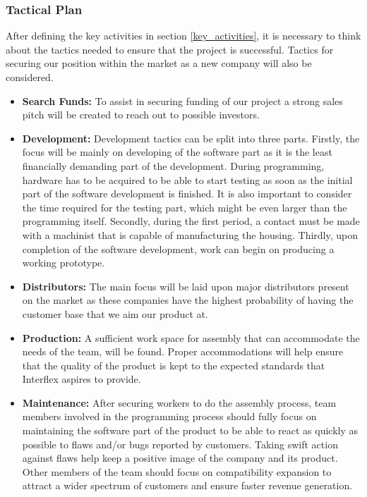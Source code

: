 \subsubsection{Tactical Plan}
After defining the key activities in section \ref{key_activities}, it is necessary to think about the tactics needed to ensure that the project is successful.
Tactics for securing our position within the market as a new company will also be considered.

\begin{itemize}
\item \textbf{Search Funds:} To assist in securing funding of our project a strong sales pitch will be created to reach out to possible investors.
\item \textbf{Development:} Development tactics can be split into three parts. 
Firstly, the focus will be mainly on developing of the software part as it is the least financially demanding part of the development. 
During programming, hardware has to be acquired to be able to start testing as soon as the initial part of the software development is finished. 
It is also important to consider the time required for the testing part, which might be even larger than the programming itself. 
Secondly, during the first period, a contact must be made with a machinist that is capable of manufacturing the housing.
Thirdly, upon completion of the software development, work can begin on producing a working prototype.
\item \textbf{Distributors:} The main focus will be laid upon major distributors present on the market as these companies have the highest probability of having the customer base that we aim our product at.
\item \textbf{Production:} A sufficient work space for assembly that can accommodate the needs of the team, will be found. Proper accommodations will help ensure that the quality of the product is kept to the expected standards that Interflex aspires to provide.
\item \textbf{Maintenance:} After securing workers to do the assembly process, team members involved in the programming process should fully focus on maintaining the software part of the product to be able to react as quickly as possible to flaws and/or bugs reported by customers. Taking swift action against flaws help keep a positive image of the company and its product. Other members of the team should focus on compatibility expansion to attract a wider spectrum of customers and ensure faster revenue generation.
\end{itemize}


